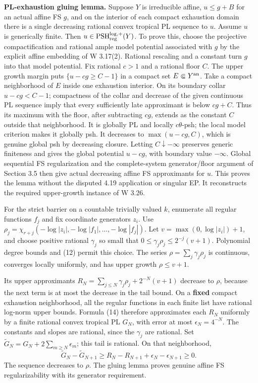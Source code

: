 \documentclass[
  11pt,
]{article}
\begin{document}
\textbf{PL-exhaustion gluing lemma.} Suppose \(Y\) is irreducible
affine, \(u\leq g+B\) for an actual affine FS \(g\), and on the interior
of each compact exhaustion domain there is a single decreasing rational
convex tropical PL sequence to \(u\). Assume \(u\) is generically
finite. Then \(u\in\operatorname{PSH}^{\log,+}_{\rm reg}(Y)\). To prove
this, choose the projective compactification and rational ample model
potential associated with \(g\) by the explicit affine embedding of W
3.17(2). Rational rescaling and a constant turn \(g\) into that model
potential. Fix rational \(c>1\) and a rational floor \(C\). The upper
growth margin puts \(\{u-cg\geq C-1\}\) in a compact set
\(E\Subset Y^{\rm an}\). Take a compact neighborhood of \(E\) inside one
exhaustion interior. On its boundary collar \(u-cg<C-1\); compactness of
the collar and decrease of the given continuous PL sequence imply that
every sufficiently late approximant is below \(cg+C\). Thus its maximum
with the floor, after subtracting \(cg\), extends as the constant \(C\)
outside that neighborhood. It is globally PL and locally
\(c\theta\)-psh; the local model criterion makes it globally psh. It
decreases to \(\max(u-cg,C)\), which is genuine global psh by decreasing
closure. Letting \(C\downarrow-\infty\) preserves generic finiteness and
gives the global potential \(u-cg\), with boundary value \(-\infty\).
Global sequential FS regularization and the complete-system
generator/floor argument of Section 3.5 then give actual decreasing
affine FS approximants for \(u\). This proves the lemma without the
disputed 4.19 application or singular EP. It reconstructs the required
upper-growth instance of W 3.26.

For the strict barrier on a countable trivially valued \(k\), enumerate
all regular functions \(f_j\) and fix coordinate generators \(z_i\). Use
\(\rho_j=\chi_{r+j}(-\log|z_i|,-\log|f_1|,\ldots,-\log|f_j|)\). Let
\(v=\max(0,\log|z_i|)+1\), and choose positive rational \(\gamma_j\) so
small that \(0\leq\gamma_j\rho_j\leq2^{-j}(v+1)\). Polynomial degree
bounds and (12) permit this choice. The series
\(\rho=\sum_j\gamma_j\rho_j\) is continuous, converges locally
uniformly, and has upper growth \(\rho\leq v+1\).

Its upper approximants \(R_N=\sum_{j\leq N}\gamma_j\rho_j+2^{-N}(v+1)\)
decrease to \(\rho\), because the next term is at most the decrease in
the tail bound. On a \textbf{fixed} compact exhaustion neighborhood, all
the regular functions in each finite list have rational log-norm upper
bounds. Formula (14) therefore approximates each \(R_N\) uniformly by a
finite rational convex tropical PL \(G_N\), with error at most
\(\epsilon_N=4^{-N}\). The constants and slopes are rational, since the
\(\gamma_j\) are rational. Set
\(\widetilde G_N=G_N+2\sum_{m\geq N}\epsilon_m\); this tail is rational.
On that neighborhood, \[\widetilde G_N-\widetilde G_{N+1}
 \geq R_N-R_{N+1}+\epsilon_N-\epsilon_{N+1}\geq0.\] The sequence
decreases to \(\rho\). The gluing lemma proves genuine affine FS
regularizability with its generator requirement.
\end{document}
